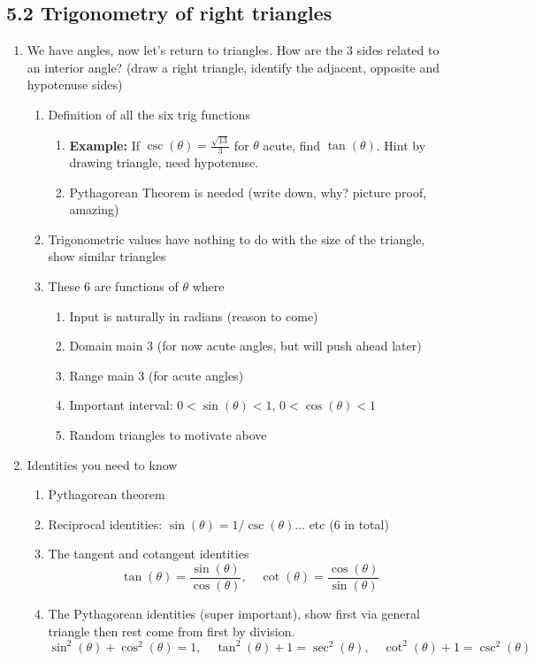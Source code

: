 \documentclass{article}
\begin{document}
\subsection{5.2 Trigonometry of right triangles}
\begin{enumerate}

\item We have angles, now let's return to triangles. How are the 3 sides related to an interior angle? (draw a right triangle, identify the adjacent, opposite and hypotenuse sides)
\begin{enumerate}
\item Definition of all the six trig functions
\begin{enumerate}
\item {\bf Example:} If $\csc(\theta) = \frac{\sqrt{13}}{3}$ for $\theta$ acute, find $\tan(\theta)$. Hint by drawing triangle, need hypotenuse.
\item Pythagorean Theorem is needed (write down, why? picture proof, amazing)
\end{enumerate}
\item Trigonometric values have nothing to do with the size of the triangle, show similar triangles
\item These 6 are functions of $\theta$ where 
\begin{enumerate}
\item Input is naturally in radians (reason to come)
\item Domain main 3 (for now acute angles, but will push ahead later)
\item Range main 3 (for acute angles)
\item Important interval: $0<\sin (\theta)<1$, $0<\cos (\theta)< 1$
\item Random triangles to motivate above
\end{enumerate}
\end{enumerate}

\item Identities you need to know
\begin{enumerate}
\item Pythagorean theorem
\item Reciprocal identities: $\sin (\theta) = 1/\csc(\theta)$... etc (6 in total)
\item The tangent and cotangent identities
$$
\tan(\theta) = \frac{\sin (\theta)}{\cos (\theta)},\quad\cot(\theta) = \frac{\cos(\theta)}{\sin(\theta)}
$$
\item The Pythagorean identities (super important), show first via general triangle then rest come from first by division.
$$
\sin^2(\theta)+\cos^2(\theta) = 1,\quad \tan^2(\theta)+1 = \sec^2(\theta),\quad \cot^2(\theta)+1 = \csc^2(\theta)
$$
\end{enumerate}


\end{enumerate}
\end{document}
